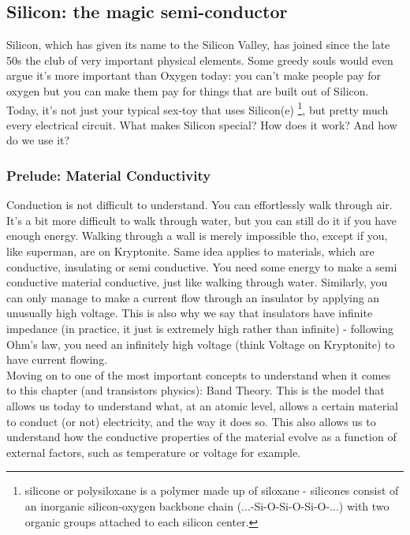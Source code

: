 \subsection{Silicon: the magic semi-conductor}

Silicon, which has given its name to the Silicon Valley, has joined since the late 50s the club of very important physical elements. Some greedy souls would even argue it's more important than Oxygen today: you can't make people pay for oxygen but you can make them pay for things that are built out of Silicon. Today, it's not just your typical sex-toy that uses Silicon(e) \footnote{silicone or polysiloxane is a polymer made up of siloxane - silicones consist of an inorganic silicon-oxygen backbone chain (...-Si-O-Si-O-Si-O-...) with two organic groups attached to each silicon center.}, but pretty much every electrical circuit. What makes Silicon special? How does it work? And how do we use it? 

\subsubsection{Prelude: Material Conductivity}

Conduction is not difficult to understand. You can effortlessly walk through air. It's a bit more difficult to walk through water, but you can still do it if you have enough energy. Walking through a wall is merely impossible tho, except if you, like superman, are on Kryptonite. Same idea applies to materials, which are conductive, insulating or semi conductive. You need some energy to make a semi conductive material conductive, just like walking through water. Similarly, you can only manage to make a current flow through an insulator by applying an unusually high voltage. This is also why we say that insulators have infinite impedance (in practice, it just is extremely high rather than infinite) - following Ohm's law, you need an infinitely high voltage (think Voltage on Kryptonite) to have current flowing. \\

Moving on to one of the most important concepts to understand when it comes to this chapter (and transistors physics): Band Theory. This is the model that allows us today to understand what, at an atomic level, allows a certain material to conduct (or not) electricity, and the way it does so. This also allows us to understand how the conductive properties of the material evolve as a function of external factors, such as temperature or voltage for example. 

